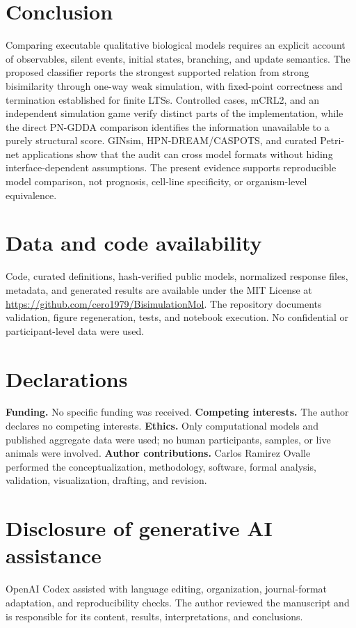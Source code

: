 \documentclass{ws-jbcb}
\numberwithin{equation}{section}
\begin{document}
\section{Conclusion}\label{sec:conclusion}

Comparing executable qualitative biological models requires an explicit account
of observables, silent events, initial states, branching, and update semantics.
The proposed classifier reports the strongest supported relation from strong
bisimilarity through one-way weak simulation, with fixed-point correctness and
termination established for finite LTSs. Controlled cases, mCRL2, and an
independent simulation game verify distinct parts of the implementation, while
the direct PN-GDDA comparison identifies the information unavailable to a purely
structural score. GINsim, HPN-DREAM/CASPOTS, and curated Petri-net applications
show that the audit can cross model formats without hiding interface-dependent
assumptions. The present evidence supports reproducible model comparison, not
prognosis, cell-line specificity, or organism-level equivalence.

\section*{Data and code availability}

Code, curated definitions, hash-verified public models, normalized response
files, metadata, and generated results are available under the MIT License at
\url{https://github.com/cero1979/BisimulationMol}. The repository documents
validation, figure regeneration, tests, and notebook execution. No confidential
or participant-level data were used.

\section*{Declarations}

\noindent\textbf{Funding.} No specific funding was received.
\textbf{Competing interests.} The author declares no competing interests.
\textbf{Ethics.} Only computational models and published aggregate data were
used; no human participants, samples, or live animals were involved.
\textbf{Author contributions.} Carlos Ramirez Ovalle performed the
conceptualization, methodology, software, formal analysis, validation,
visualization, drafting, and revision.

\section*{Disclosure of generative AI assistance}

OpenAI Codex assisted with language editing, organization, journal-format
adaptation, and reproducibility checks. The author reviewed the manuscript and
is responsible for its content, results, interpretations, and conclusions.


\end{document}

